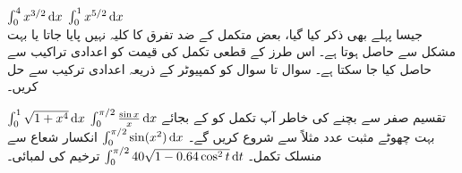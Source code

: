 $\int_0^4 x^{3/2}\dif x$
$\int_0^1 x^{5/2}\dif x$
\\
جیسا پہلے بھی ذکر کیا گیا، بعض متکمل کے ضد تفرق کا کلیہ نہیں پایا جاتا  یا بہت مشکل سے حاصل ہوتا ہے۔ اس طرز کے قطعی تکمل کی قیمت کو اعدادی تراکیب سے حاصل کیا جا سکتا ہے۔ سوال  تا سوال  کو کمپیوٹر کے ذریعہ اعدادی ترکیب سے حل کریں۔

$\int_0^1\sqrt{1+x^4}\dif x$
$\int_0^{\pi/2}\tfrac{\sin x}{x}\dif x$\quad
تقسیم صفر سے بچنے کی خاطر آپ تکمل کو  کے بجائے بہت چھوٹے مثبت عدد مثلاً  سے شروع کریں گے۔
$\int_0^{\pi/2}\sin(x^2)\dif x$\quad
انکسار شعاع سے منسلک تکمل۔
$\int_0^{\pi/2}40\sqrt{1-0.64\cos^2t}\dif t$ \quad
ترخیم  کی لمبائی۔



